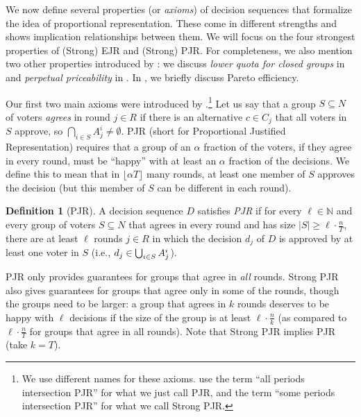 \documentclass[10pt]{scrartcl}
\theoremstyle{plain}
\theoremstyle{definition}
\newtheorem{definition}[theorem]{Definition}
\renewcommand*{\geq}{\geqslant}
\begin{document}
We now define several properties (or \emph{axioms}) of decision sequences that formalize the idea of proportional representation. These come in different strengths and  shows implication relationships between them. We will focus on the four strongest properties of (Strong) EJR and (Strong) PJR. For completeness, we also mention two other properties introduced by \citet{lacknermaly2023}: we discuss \emph{lower quota for closed groups} in  and \emph{perpetual priceability} in . In , we briefly discuss Pareto efficiency.

Our first two main axioms were introduced by \citet{bulteau2021jr}.\footnote{We use different names for these axioms. \citet{bulteau2021jr} use the term ``all periods intersection PJR'' for what we just call PJR, and the term ``some periods intersection PJR'' for what we call Strong PJR.}
Let us say that a group $S\subseteq N$ of voters \textit{agrees} in round $j \in R$ if there is an alternative $c \in C_j$ that all voters in $S$ approve, so $\bigcap_{i\in S} A^i_j \neq \emptyset$. PJR (short for Proportional Justified Representation) requires that a group of an $\alpha$ fraction of the voters, if they agree in every round, must be ``happy'' with at least an $\alpha$ fraction of the decisions. We define this to mean that in $\lfloor \alpha T \rfloor$ many rounds, at least one member of $S$ approves the decision (but this member of $S$ can be different in each round).

\begin{definition}[PJR]
    \label{def:PJR}
    A decision sequence $D$ satisfies \emph{PJR} if for every $\ell \in \mathbb N$ and every group of voters $S \subseteq N$ that agrees in every round and has size $|S| \geq \ell \cdot \frac{n}{T}$, there are at least $\ell$ rounds $j \in R$ in which the decision $d_j$ of $D$ is approved by at least one voter in $S$ (i.e., $d_j \in \bigcup_{i \in S} \smash{A_j^i}$).
\end{definition}

PJR only provides guarantees for groups that agree in \emph{all} rounds. Strong PJR also gives guarantees for groups that agree only in some of the rounds, though the groups need to be larger: a group that agrees in $k$ rounds deserves to be happy with $\ell$ decisions if the size of the group is at least $\ell \cdot \frac{n}{k}$ (as compared to $\ell \cdot \frac{n}{T}$ for groups that agree in all rounds). Note that Strong PJR implies PJR (take $k = T$).
\end{document}
